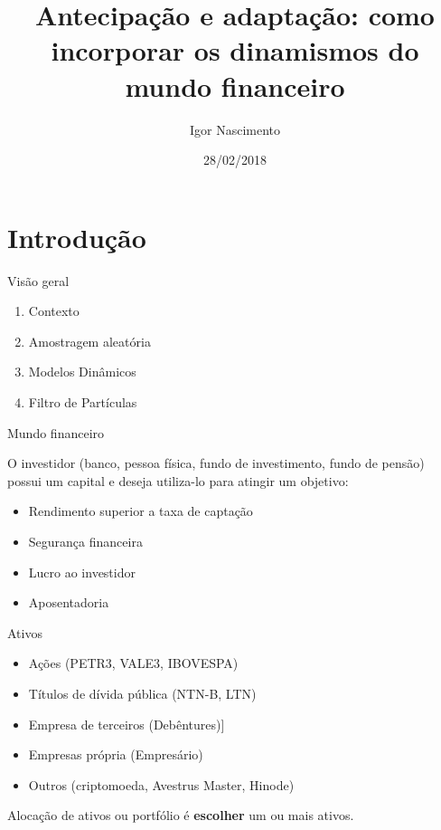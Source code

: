 \documentclass{beamer}
\title[Artigo]{Antecipação e adaptação: como incorporar os dinamismos do mundo financeiro}
\author[Igor Nascimento]{Igor Nascimento}
\institute[LAMFO]{Laboratório de Aprendizado de Máquina em Finanças e Organizações - LAMFO}
\date[2018]{28/02/2018}
\begin{document}
\begin{frame}
  \titlepage
\end{frame}

\section{Introdução}

\begin{frame}{Visão geral}


\vspace{.15cm}
\begin{enumerate}
\item Contexto
\vspace{.15cm}
\item Amostragem aleatória
\vspace{.15cm}
\item Modelos Dinâmicos
\vspace{.15cm}
\item Filtro de Partículas
\end{enumerate}

\end{frame}



\begin{frame}{Mundo financeiro}

O investidor (banco, pessoa física, fundo de investimento, fundo de pensão) possui um capital e deseja utiliza-lo para atingir um objetivo:

\begin{itemize}
\item Rendimento superior a taxa de captação 
\item Segurança financeira
\item Lucro ao investidor
\item Aposentadoria
\end{itemize}

\end{frame}

\begin{frame}{Ativos}

\begin{itemize}
\item Ações (PETR3, VALE3, IBOVESPA)
\pause
\item Títulos de dívida pública (NTN-B, LTN)
\pause
\item Empresa de terceiros (Debêntures)]
\pause
\item Empresas própria (Empresário)
\pause
\item Outros (criptomoeda, Avestrus Master, Hinode)
\end{itemize}

Alocação de ativos ou portfólio é \textbf{escolher} um ou mais ativos.


\end{frame}
\end{document}
